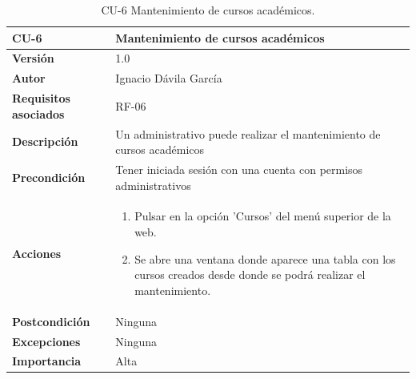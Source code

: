 \begin{table}[p]
	\centering
	\begin{tabularx}{\linewidth}{ p{} p{} }
		\toprule
		\textbf{CU-6}    & \textbf{Mantenimiento de cursos académicos}\\
		\toprule
		\textbf{Versión}              & 1.0    \\
		\textbf{Autor}                & Ignacio Dávila García \\
		\textbf{Requisitos asociados} & RF-06 \\
		\textbf{Descripción}          & Un administrativo puede realizar el mantenimiento de cursos académicos \\
		\textbf{Precondición}         & Tener iniciada sesión con una cuenta con permisos administrativos \\
		\textbf{Acciones}             &
		\begin{enumerate}
			\def\labelenumi{\arabic{enumi}.}
			\tightlist
			\item Pulsar en la opción 'Cursos' del menú superior de la web.
			\item Se abre una ventana donde aparece una tabla con los cursos creados desde donde se podrá realizar el mantenimiento.
		\end{enumerate}\\
		\textbf{Postcondición}        & Ninguna \\
		\textbf{Excepciones}          & Ninguna \\
		\textbf{Importancia}          & Alta \\
		\bottomrule
	\end{tabularx}
	\caption{CU-6 Mantenimiento de cursos académicos.}
\end{table}

